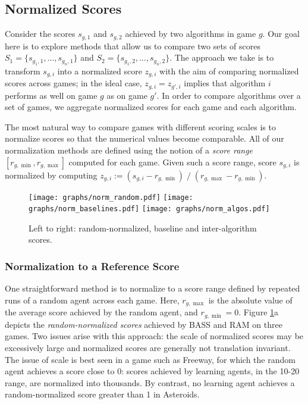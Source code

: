 \documentclass[twoside,11pt]{article}
\newcommand{\gamename}[1]{{\sc #1}}
\begin{document}
\subsection{Normalized Scores}

Consider the scores $s_{g,1}$ and $s_{g,2}$ achieved by two algorithms in game $g$. Our goal here is to explore methods that allow us to compare two sets of scores $S_1 = \{ s_{g_1, 1}, \dots, s_{g_n, 1} \}$ and $S_2 = \{ s_{g_1, 2}, \dots, s_{g_n, 2} \}$. The approach we take is to transform $s_{g,i}$ into a normalized score $z_{g,i}$ with the aim of comparing normalized scores across games; in the ideal case, $z_{g,i} = z_{g',i}$ implies that algorithm $i$ performs as well on game $g$ as on game $g'$. In order to compare algorithms over a set of games, we aggregate normalized scores for each game and each algorithm. 

The most natural way to compare games with different scoring scales is to normalize scores so that the numerical values become comparable. All of our normalization methods are defined using the notion of a  \emph{score range} $[r_{g,\min}, r_{g,\max} ]$ computed for each game. Given such a score range, score $s_{g,i}$ is normalized by computing $z_{g,i} := (s_{g,i} - r_{g,\min}) \; / \; (r_{g,\max} - r_{g,\min})$.

\begin{figure}
\begin{center}
\texttt{[image: graphs/norm\_random.pdf]}
\hspace{-1em}
\texttt{[image: graphs/norm\_baselines.pdf]}
\hspace{-1em}
\texttt{[image: graphs/norm\_algos.pdf]}
\caption{Left to right: random-normalized, baseline and inter-algorithm scores.\label{fig:evaluation:normalized_scores}}
\end{center}
\end{figure}

\subsubsection{Normalization to a Reference Score}

One straightforward method is to normalize to a score range defined by repeated runs of a random agent across each game. Here, $r_{g,\max}$ is the absolute value of the average score achieved by the random agent, and $r_{g,\min} = 0$. 
Figure \ref{fig:evaluation:normalized_scores}a depicts the \emph{random-normalized scores} achieved by BASS and RAM on three games.  Two issues arise with this approach: the scale of normalized scores may be excessively large and normalized scores are generally not translation invariant. 
The issue of scale is best seen in a game such as \gamename{Freeway}, for which the random agent achieves a score close to 0: scores achieved by learning agents, in the 10-20 range, are normalized into thousands. 
By contrast, no learning agent achieves a random-normalized score greater than 1 in Asteroids. 
\end{document}
